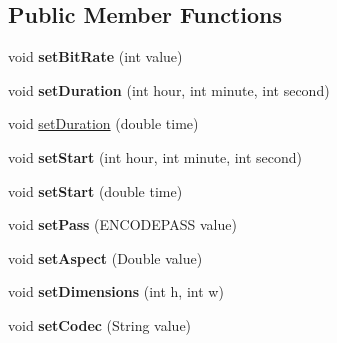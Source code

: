 \subsection*{Public Member Functions}
\begin{DoxyCompactItemize}
\item 
\hypertarget{classvideo_1_1_video_profile_a45af74f7b83f89f90aab726db796047e}{
void {\bfseries setBitRate} (int value)}
\label{classvideo_1_1_video_profile_a45af74f7b83f89f90aab726db796047e}

\item 
\hypertarget{classvideo_1_1_video_profile_a190e8832c69295b46dee9c34206645d8}{
void {\bfseries setDuration} (int hour, int minute, int second)}
\label{classvideo_1_1_video_profile_a190e8832c69295b46dee9c34206645d8}

\item 
void \hyperlink{classvideo_1_1_video_profile_a9aabb5f252d2fc467c74d3123864d94a}{setDuration} (double time)
\item 
\hypertarget{classvideo_1_1_video_profile_ae45387e20db1d9bdcfc4b415fbd5f03f}{
void {\bfseries setStart} (int hour, int minute, int second)}
\label{classvideo_1_1_video_profile_ae45387e20db1d9bdcfc4b415fbd5f03f}

\item 
\hypertarget{classvideo_1_1_video_profile_a04d4b32f8f8634cb85d44a48a0bf4206}{
void {\bfseries setStart} (double time)}
\label{classvideo_1_1_video_profile_a04d4b32f8f8634cb85d44a48a0bf4206}

\item 
\hypertarget{classvideo_1_1_video_profile_a830cf2659e50fe7efbd43075e95099eb}{
void {\bfseries setPass} (ENCODEPASS value)}
\label{classvideo_1_1_video_profile_a830cf2659e50fe7efbd43075e95099eb}

\item 
\hypertarget{classvideo_1_1_video_profile_a3c6a6649fd9541568642d2cc1d7e27e3}{
void {\bfseries setAspect} (Double value)}
\label{classvideo_1_1_video_profile_a3c6a6649fd9541568642d2cc1d7e27e3}

\item 
\hypertarget{classvideo_1_1_video_profile_ad15c71c642d956a6a86bdaed565fc6cc}{
void {\bfseries setDimensions} (int h, int w)}
\label{classvideo_1_1_video_profile_ad15c71c642d956a6a86bdaed565fc6cc}

\item 
\hypertarget{classvideo_1_1_video_profile_a95ba1b3043ba85255ec3d4f06c96cc86}{
void {\bfseries setCodec} (String value)}
\label{classvideo_1_1_video_profile_a95ba1b3043ba85255ec3d4f06c96cc86}


\end{DoxyCompactItemize}
